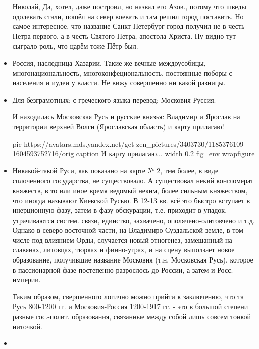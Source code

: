 \begin{itemize}
Николай, Да, хотел, даже построил, но назвал его Азов., потому что шведы
одолевать стали, пошёл на север воевать и там решил город поставить. Но самое
интересное, что название Санкт-Петербург город получил не в честь Петра
первого, а в честь Святого Петра, апостола Христа. Ну видно тут сыграло роль,
что царём тоже Пётр был.

\item {}

Россия, наследница Хазарии. Такие же вечные междоусобицы, многонациональность,
многоконфециональность, постоянные поборы с населения и иудеи у власти. Не вижу
совершенно ни какой разницы.

\item {}

Для безграмотных: с греческого языка перевод: Московия-Руссия.

И находилась Московская Русь и русские князья: Владимир и Ярослав на территории
верхней Волги (Ярославская область) и карту прилагаю!

\ifcmt
  pic https://avatars.mds.yandex.net/get-zen_pictures/3403730/1185376109-1604593752716/orig
  caption И карту прилагаю...
	width 0.2
	fig_env wrapfigure
\fi


\item {}

Никакой-такой Руси, как показано на карте № 2, тем более, в виде сплоченного
государства, не существовало. А существовал некий конгломерат княжеств, в то
или иное время ведомый неким, более сильным княжеством, что иногда называют
Киевской Русью. В 12-13 вв. всё это быстро вступает в инерционную фазу, затем в
фазу обскурации, т.е. приходит в упадок, утрачиваются систем. связи, единство,
захвачено, ополячено-олитовчено и т.д. Однако в северо-восточной части, на
Владимиро-Суздальской земле, в том числе под влиянием Орды, случается новый
этногенез, замешанный на славянах, литовцах, тюрках и финно-уграх, и на сцену
выползает новое образование, получившие название Московия (т.н. Московская
Русь), которое в пассионарной фазе постепенно разрослось до России, а затем и
Росс. империи.

Таким образом, свершенного логично можно прийти к заключению, что та Русь
800-1200 гг. и Московия-Россия 1200-1917 гг. - это в большой степени разные
гос.-полит. образования, связанные между собой лишь совсем тонкой ниточкой.


\item {}


\end{itemize}
